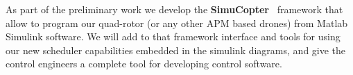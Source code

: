\documentclass[11pt]{article}
\begin{document}
As part of the preliminary work we develop the \textbf{SimuCopter}~\cite{SimuCopter} framework that allow to program our quad-rotor (or any other APM based drones) from Matlab Simulink software.
We will add to that framework interface and tools for using our new scheduler capabilities embedded in the simulink diagrams, and give the control engineers a complete tool for developing control software.


    
    {}
\end{document}
